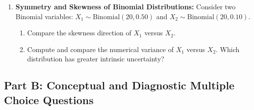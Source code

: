 \begin{enumerate}
    \item \textbf{Symmetry and Skewness of Binomial Distributions:} Consider two Binomial variables: $X_1 \sim \text{Binomial}(20, 0.50)$ and $X_2 \sim \text{Binomial}(20, 0.10)$.
    \begin{enumerate}
        \item Compare the skewness direction of $X_1$ versus $X_2$.
        \item Compute and compare the numerical variance of $X_1$ versus $X_2$. Which distribution has greater intrinsic uncertainty?
    \end{enumerate}
\end{enumerate}

\subsection*{Part B: Conceptual and Diagnostic Multiple Choice Questions}

